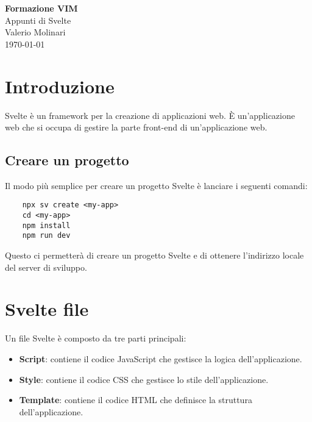 \documentclass[12pt]{article}
\begin{document}
\begin{titlepage}
\begin{center}
\vspace*{3cm}
\Huge\textcolor{primary}{\textbf{Formazione VIM}} \\[1cm]
\Large\textcolor{secondary}{Appunti di Svelte} \\[1cm]
\textcolor{accent}{Valerio Molinari}\\
\vfill
\today
\end{center}
\end{titlepage}

\tableofcontents
\newpage

\section{Introduzione}
Svelte è un framework per la creazione di applicazioni web. 
È un'applicazione web che si occupa di gestire la parte front-end 
di un'applicazione web.


\subsection{Creare un progetto}
Il modo più semplice per creare un progetto Svelte è 
lanciare i seguenti comandi:
\begin{verbatim}
    npx sv create <my-app>
    cd <my-app>
    npm install
    npm run dev
\end{verbatim}
Questo ci permetterà di creare un progetto Svelte e di ottenere l'indirizzo
locale del server di sviluppo.

\section{Svelte file}
Un file Svelte è composto da tre parti principali:
\begin{itemize}
    \item \textbf{Script}: contiene il codice JavaScript che gestisce la logica dell'applicazione.
    \item \textbf{Style}: contiene il codice CSS che gestisce lo stile dell'applicazione.
    \item \textbf{Template}: contiene il codice HTML che definisce la struttura dell'applicazione.
\end{itemize}
\end{document}
